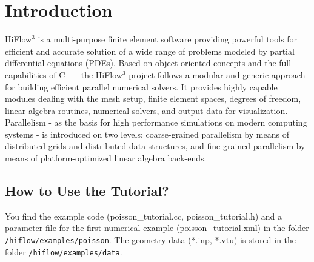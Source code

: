 \documentclass[a4paper, 11pt, twoside]{article}
\begin{document}
\thispagestyle{empty}




\newcommand{\dd}{\mathrm{d}}
\newtheorem{remark}{Remark}[section]
\thispagestyle{empty}
\tableofcontents

\newpage
\pagestyle{plain}
\vspace{0.5cm}
\section{Introduction}

HiFlow$^3$ is a multi-purpose finite element software providing powerful tools for efficient and accurate solution of a wide range of problems modeled by partial differential equations (PDEs). Based on object-oriented concepts and the full capabilities of C++ the HiFlow$^3$ project follows a modular and generic approach for building efficient parallel numerical solvers. It provides highly capable modules dealing with the mesh setup, finite element spaces, degrees of freedom, linear algebra routines, numerical solvers, and output data for visualization. Parallelism - as the basis for high performance simulations on modern computing systems - is introduced on two levels: coarse-grained parallelism by means of distributed grids and distributed data structures, and fine-grained parallelism by means of platform-optimized linear algebra back-ends.

\subsection{How to Use the Tutorial?}
You find the example code (poisson\_tutorial.cc, poisson\_tutorial.h) and a parameter file for the first numerical example (poisson\_tutorial.xml) in the folder \verb'/hiflow/examples/poisson'. The geometry data (*.inp, *.vtu) is stored in the folder \verb'/hiflow/examples/data'.
\end{document}
